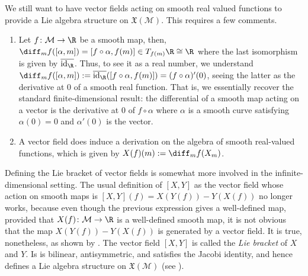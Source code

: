 \begin{obs} \label{obs_vector_fields_and_differentials_inf_dim}
    We still want to have vector fields acting on smooth real valued functions to provide a Lie algebra structure on \(\mathfrak{X}(\mathcal{M})\). This requires a few comments.
    \begin{enumerate}
        \item Let \(f \colon \mathcal{M} \to \R\) be a smooth map, then, \(\diff_mf([\alpha, m]) = [f \circ \alpha, f(m)] \in T_{f(m)}\R \cong \R\) where the last isomorphism is given by \(\overline{\mathrm{id}_\R}\). Thus, to see it as a real number, we understand \(\diff_mf([\alpha, m]):=\overline{\mathrm{id}_\R}([f\circ \alpha, f(m)])=(f \circ \alpha)'(0)\), seeing the latter as the derivative at \(0\) of a smooth real function. That is, we essentially recover the standard finite-dimensional result: the differential of a smooth map acting on a vector is the derivative at \(0\) of \(f \circ \alpha\) where \(\alpha\) is a smooth curve satisfying \(\alpha(0)=0\) and \(\alpha'(0)\) is the vector.
        \item A vector field does induce a derivation on the algebra of smooth real-valued functions, which is given by \(X(f)(m):=\diff_mf(X_m)\). 
    \end{enumerate}
\end{obs}

Defining the Lie bracket of vector fields is somewhat more involved in the infinite-dimensional setting. The usual definition of \([X,Y]\) as the vector field whose action on smooth maps is \([X,Y](f)=X(Y(f))-Y(X(f))\) no longer works, because even though the previous expression gives a well-defined map, provided that \(X(f)\colon \mathcal{M} \to \R\) is a well-defined smooth map, it is not obvious that the map \(X(Y(f))-Y(X(f))\) is generated by a vector field. It is true, nonetheless, as shown by  \parencite[Prop. V-1.1 and Prop V-1.3]{SergeLang}. The vector field \([X,Y]\) is called the \textit{Lie bracket} of \(X\) and \(Y\). Is is bilinear, antisymmetric, and satisfies the Jacobi identity, and hence defines a Lie algebra structure on \(\mathfrak{X}(\mathcal{M})\) (see \parencite[Cor. 1.4]{SergeLang}). \\

